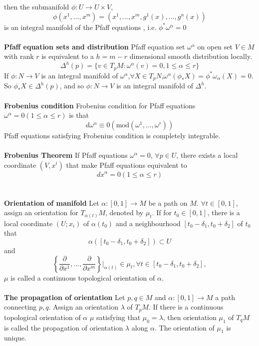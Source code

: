 \documentclass{article}
\begin{document}
then the submanifold $\phi:U \to U \times V$,
\[\phi(x^1,\ldots,x^m) = (x^1,\ldots,x^m,g^1(x),\ldots,g^n(x))\]
is an integral manifold of the Pfaff equations , i.e. $\phi^* \omega^{\alpha} =0$\\ \\
\textbf{Pfaff equation sets and distribution} Pfaff equation set $\omega^{\alpha}$ on open set $V \in M$ with rank $r$ is equivalent to a $h=m-r$ dimensional smooth distribution locally.
\[\Delta^h(p) = \{v \in T_pM:\omega^{\alpha}(v)=0,1 \le \alpha \le r \}\]
If $\phi:N \to V$ is an integral manifold of $\omega^{\alpha}$,$\forall X \in T_pN$,$\omega^{\alpha}(\phi_{*}X) = \phi^* \omega_{\alpha}(X) =0$. So $\phi_* X \in \Delta^h(p)$, and so $\phi:N \to V$ is an integral manifold of $\Delta^h$.\\ \\
\textbf{Frobenius condition} Frobenius condition for Pfaff equations $\omega^{\alpha} =0(1 \le \alpha \le r)$ is that
\[d\omega^{\alpha} \equiv 0(\mathrm{mod}(\omega^1,\ldots,\omega^r))\]
Pfaff equations satisfying Frobenius condition is completely integrable.\\ \\
\textbf{Frobenius Theorem} If Pfaff equations $\omega^{\alpha} = 0$, $\forall p \in U$, there exists a local coordinate $(V,x^i)$ that make Pfaff equations equivalent to
\[dx^{\alpha}=0 (1 \le \alpha \le r)\]\\ \\
\textbf{Orientation of manifold} Let $\alpha:[0,1] \to M$ be a path on $M$. $\forall t \in [0,1]$, assign an orientation for $T_{\alpha(t)}M$, denoted by $\mu_t$. If for $t_0 \in [0,1]$, there is a local coordinate $(U;x_i)$ of $\alpha(t_0)$ and a neighbourhood $[t_0-\delta_1,t_0+\delta_2]$ of $t_0$ that
\[\alpha([t_0-\delta_1,t_0+\delta_2]) \subset U\] 
and
\[\left\{ \frac{\partial}{\partial x^1},\ldots,\frac{\partial}{\partial x^m}\right\}|_{\alpha(t)} \in \mu_t,\forall t \in [t_0-\delta_1,t_0+\delta_2],\] 
$\mu$ is called a continuous topological orientation of $\alpha$.\\ \\
\textbf{The propagation of orientation} Let $p,q \in M$ and $\alpha:[0,1] \to M$ a path connecting $p,q$. Assign an orientation $\lambda$ of $T_pM$. If there is a continuous topological orientation of $\alpha$ $\mu$ satisfying that $\mu_0 = \lambda$, then orientation $\mu_1$ of $T_qM$ is called the propagation of orientation $\lambda$ along $\alpha$. The orientation of $\mu_1$ is unique.\\ \\
\end{document}
